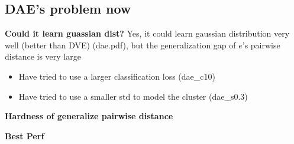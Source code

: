 \documentclass{article}
\begin{document}
\subsection{DAE's problem now}

\noindent \textbf{Could it learn guassian dist?} Yes, it could learn gaussian distribution very well (better than DVE) (dae.pdf), but the generalization gap of $e$'s pairwise distance is very large
    
    \begin{itemize}
        \item Have tried to use a larger classification loss (dae\_c10)
        \item Have tried to use a smaller std to model the cluster (dae\_s0.3) 
    \end{itemize}

\noindent \textbf{Hardness of generalize pairwise distance}

\noindent \textbf{Best Perf} 
\end{document}
